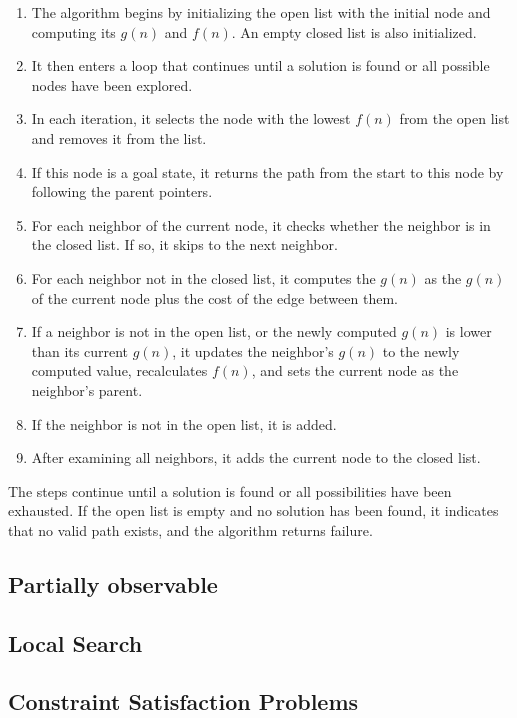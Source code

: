 \documentclass[a4paper,UKenglish,cleveref, autoref, thm-restate]{qlinhta}
\begin{document}
\begin{enumerate}
\item The algorithm begins by initializing the open list with the initial node and computing its $g(n)$ and $f(n)$. An empty closed list is also initialized.
\item It then enters a loop that continues until a solution is found or all possible nodes have been explored.
\item In each iteration, it selects the node with the lowest $f(n)$ from the open list and removes it from the list.
\item If this node is a goal state, it returns the path from the start to this node by following the parent pointers.
\item For each neighbor of the current node, it checks whether the neighbor is in the closed list. If so, it skips to the next neighbor.
\item For each neighbor not in the closed list, it computes the $g(n)$ as the $g(n)$ of the current node plus the cost of the edge between them.
\item If a neighbor is not in the open list, or the newly computed $g(n)$ is lower than its current $g(n)$, it updates the neighbor's $g(n)$ to the newly computed value, recalculates $f(n)$, and sets the current node as the neighbor's parent.
\item If the neighbor is not in the open list, it is added.
\item After examining all neighbors, it adds the current node to the closed list.
\end{enumerate}

The steps continue until a solution is found or all possibilities have been exhausted. If the open list is empty and no solution has been found, it indicates that no valid path exists, and the algorithm returns failure.


\subsection{Partially observable}
\subsection{Local Search}
\subsection{Constraint Satisfaction Problems}
\end{document}
